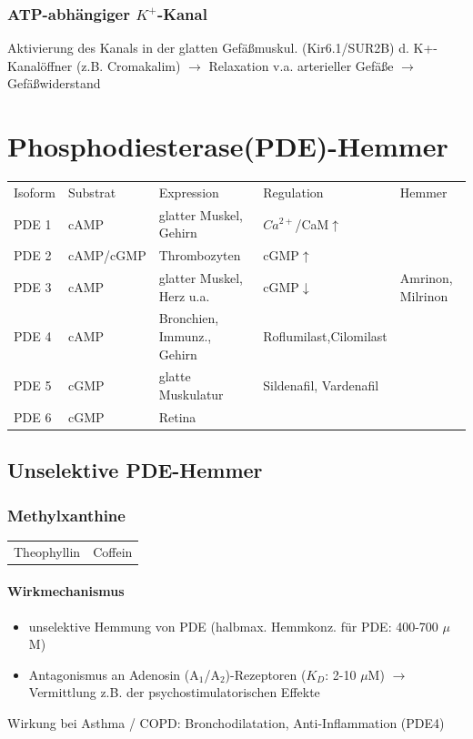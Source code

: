 \documentclass[10pt,a4paper]{report}
\begin{document}
\subsubsection{ATP-abhängiger $K^+$-Kanal}

Aktivierung des Kanals in der glatten Gefäßmuskul. (Kir6.1/SUR2B) d. K+-Kanalöffner (z.B. Cromakalim) $\rightarrow$ Relaxation v.a. arterieller Gefäße $\rightarrow$ Gefäßwiderstand 

\section{Phosphodiesterase(PDE)-Hemmer}

\begin{tabularx}{\textwidth}{XXXXX}
Isoform&Substrat&Expression&Regulation&Hemmer\\
PDE 1&cAMP&glatter Muskel, Gehirn&$Ca^{2+}$/CaM$\uparrow$\\  
PDE 2&cAMP/cGMP&Thrombozyten&cGMP$\uparrow$\\
PDE 3&cAMP&glatter Muskel, Herz u.a.&cGMP$\downarrow$&Amrinon, Milrinon\\
PDE 4&cAMP&Bronchien, Immunz., Gehirn&Roflumilast,Cilomilast\\
PDE 5&cGMP&glatte Muskulatur&Sildenafil, Vardenafil\\
PDE 6&cGMP&Retina&&\\
\end{tabularx}

\subsection{Unselektive PDE-Hemmer}
\subsubsection{Methylxanthine}

\begin{tabularx}{\textwidth}{XX}
Theophyllin&Coffein\\
\end{tabularx}

\paragraph{Wirkmechanismus}
\begin{itemize}
	\item unselektive Hemmung von PDE (halbmax. Hemmkonz. für PDE: 400-700 $\mu$ M) 
	\item Antagonismus an Adenosin (A$_1$/A$_2$)-Rezeptoren ($K_D$: 2-10 $\mu$M)
	$\rightarrow$ Vermittlung z.B. der psychostimulatorischen Effekte
\end{itemize}
Wirkung bei Asthma / COPD: Bronchodilatation, Anti-Inflammation (PDE4)
\end{document}
